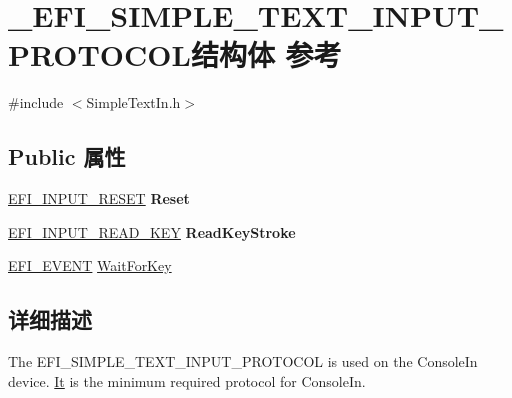 \hypertarget{struct___e_f_i___s_i_m_p_l_e___t_e_x_t___i_n_p_u_t___p_r_o_t_o_c_o_l}{}\section{\+\_\+\+E\+F\+I\+\_\+\+S\+I\+M\+P\+L\+E\+\_\+\+T\+E\+X\+T\+\_\+\+I\+N\+P\+U\+T\+\_\+\+P\+R\+O\+T\+O\+C\+O\+L结构体 参考}
\label{struct___e_f_i___s_i_m_p_l_e___t_e_x_t___i_n_p_u_t___p_r_o_t_o_c_o_l}


{\ttfamily \#include $<$Simple\+Text\+In.\+h$>$}

\subsection*{Public 属性}
\begin{DoxyCompactItemize}
\item 
\mbox{\label{struct___e_f_i___s_i_m_p_l_e___t_e_x_t___i_n_p_u_t___p_r_o_t_o_c_o_l_a715d127e4c4b66bfa7a8328b55458430}} 
\hyperlink{_simple_text_in_8h_adf982c71dcc0af2e4495044e66201b53}{E\+F\+I\+\_\+\+I\+N\+P\+U\+T\+\_\+\+R\+E\+S\+ET} {\bfseries Reset}
\item 
\mbox{\label{struct___e_f_i___s_i_m_p_l_e___t_e_x_t___i_n_p_u_t___p_r_o_t_o_c_o_l_a3743cac86d06a5c36a227ad475e69701}} 
\hyperlink{_simple_text_in_8h_a09083a7dedf5d4f8fd1d437289869d39}{E\+F\+I\+\_\+\+I\+N\+P\+U\+T\+\_\+\+R\+E\+A\+D\+\_\+\+K\+EY} {\bfseries Read\+Key\+Stroke}
\item 
\hyperlink{_uefi_base_type_8h_a7f3111de303d836d8d3711c39363f81a}{E\+F\+I\+\_\+\+E\+V\+E\+NT} \hyperlink{struct___e_f_i___s_i_m_p_l_e___t_e_x_t___i_n_p_u_t___p_r_o_t_o_c_o_l_abb6bc8cb1551b10c69563126524a1775}{Wait\+For\+Key}
\end{DoxyCompactItemize}


\subsection{详细描述}
The E\+F\+I\+\_\+\+S\+I\+M\+P\+L\+E\+\_\+\+T\+E\+X\+T\+\_\+\+I\+N\+P\+U\+T\+\_\+\+P\+R\+O\+T\+O\+C\+OL is used on the Console\+In device. \hyperlink{class_it}{It} is the minimum required protocol for Console\+In. 

